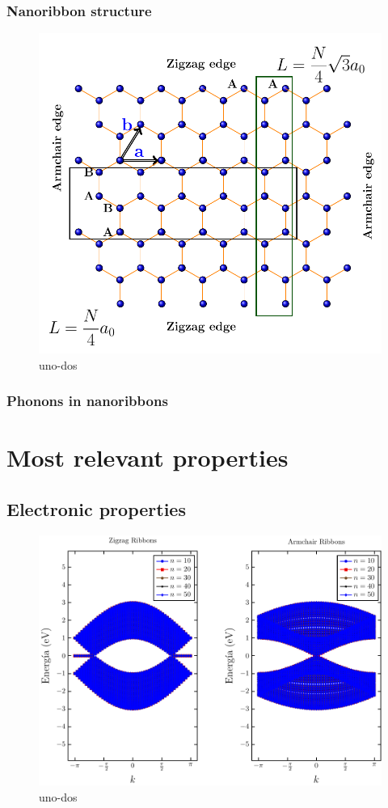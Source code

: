 \subsubsection{Nanoribbon structure}

\begin{figure}[H]
	\centering
	\includegraphics[width=0.75\linewidth]{FIGURES/Physical_Background/Graphene_States.pdf}
	\caption{uno-dos}
	\label{fig:sq-how to reflex}
\end{figure}

\subsubsection{Phonons in nanoribbons}

\section{Most relevant properties}




\subsection{Electronic properties}


\begin{figure}[H]
	\centering
	\includegraphics[width=0.82\linewidth]{FIGURES/Physical_Background/Teoria_Fig5b.pdf}
	\caption{uno-dos}
	\label{fig:sq-how to reflex}
\end{figure}

